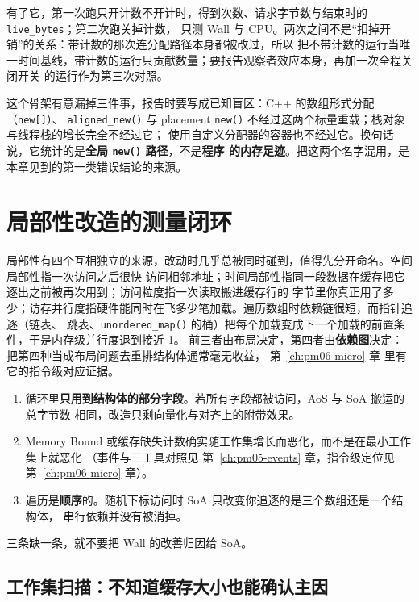 \documentclass[12pt,a4paper,fontset=fandol]{ctexbook}
\newcommand{\Fn}[1]{\texttt{#1()}}
\newcommand{\Tp}[1]{\texttt{#1}}
\newcommand{\Bk}{\discretionary{}{}{}}
\newcommand{\Lang}[1]{\textsf{#1}}
\newcommand{\CPP}{\Lang{C++}}
\newcommand{\MWall}{\Lang{Wall}}
\newcommand{\MCpu}{\Lang{CPU}}
\newcommand{\Mx}[1]{\textsf{#1}}
\begin{document}
有了它，第一次跑只开计数不开计时，得到次数、请求字节数与结束时的 \Tp{live\_bytes}；第二次跑关掉计数，
只测 \MWall{} 与 \MCpu{}。两次之间不是``扣掉开销''的关系：带计数的那次连分配路径本身都被改过，所以
把不带计数的运行当唯一时间基线，带计数的运行只贡献数量；要报告观察者效应本身，再加一次全程关闭开关
的运行作为第三次对照。

这个骨架有意漏掉三件事，报告时要写成已知盲区：\CPP{} 的数组形式分配（\Tp{new[]}）、
\Fn{aligned\_new} 与 placement \Fn{new} 不经过这两个标量重载；栈对象与线程栈的增长完全不经过它；
使用自定义分配器的容器也不经过它。换句话说，它统计的是\textbf{全局 \Fn{new} 路径}，不是\textbf{程序
的内存足迹}。把这两个名字混用，是本章见到的第一类错误结论的来源。

\section{局部性改造的测量闭环}
\label{sec:pm07-locality}

局部性有四个互相独立的来源，改动时几乎总被同时碰到，值得先分开命名。空间局部性指一次访问之后很快
访问相邻地址；时间局部性指同一段数据在缓存把它逐出之前被再次用到；访问粒度指一次读取搬进缓存行的
字节里你真正用了多少；访存并行度指硬件能同时在飞多少笔加载。遍历数组时依赖链很短，而指针追逐（链表、
跳表、\Fn{unordered{\Bk}\_map} 的桶）把每个加载变成下一个加载的前置条件，于是内存级并行度退到接近 1。
前三者由布局决定，第四者由\textbf{依赖图}决定：把第四种当成布局问题去重排结构体通常毫无收益，
第~\ref{ch:pm06-micro} 章 里有它的指令级对应证据。

\begin{guideline}[title={AoS 改 SoA 之前必须存在的三个证据}]
  \begin{enumerate}
    \item 循环里\textbf{只用到结构体的部分字段}。若所有字段都被访问，AoS 与 SoA 搬运的总字节数
          相同，改造只剩向量化与对齐上的附带效果。
    \item \Mx{Memory Bound} 或缓存缺失计数确实随工作集增长而恶化，而不是在最小工作集上就恶化
          （事件与三工具对照见 第~\ref{ch:pm05-events} 章，指令级定位见 第~\ref{ch:pm06-micro} 章）。
    \item 遍历是\textbf{顺序}的。随机下标访问时 SoA 只改变你追逐的是三个数组还是一个结构体，
          串行依赖并没有被消掉。
  \end{enumerate}
  三条缺一条，就不要把 \MWall{} 的改善归因给 SoA。
\end{guideline}

\subsection{工作集扫描：不知道缓存大小也能确认主因}
\label{sub:pm07-sweep}
\end{document}

